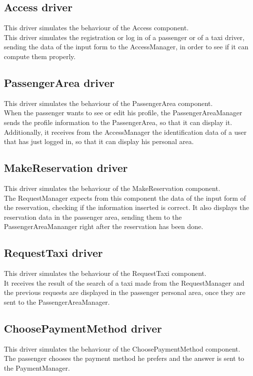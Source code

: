 \documentclass[18pt,oneside,a4paper, titlepage]{article}
\begin{document}
	\subsection{Access driver}
		This driver simulates the behaviour of the Access component.\\ This driver simulates the registration or log in of a passenger or of a taxi driver, sending the data of the input form to the AccessManager, in order to see if it can compute them properly.
	\subsection{PassengerArea driver}
		This driver simulates the behaviour of the PassengerArea component.\\ When the passenger wants to see or edit his profile, the PassengerAreaManager sends the profile information to the PassengerArea, so that it can display it. Additionally, it receives from the AccessManager the identification data of a user that has just logged in, so that it can display his personal area.
	\subsection{MakeReservation driver}
		This driver simulates the behaviour of the MakeReservation component.\\ The RequestManager expects from this component the data of the input form of the reservation, checking if the information inserted is correct. It also displays the reservation data in the passenger area, sending them to the PassengerAreaMananger right after the reservation has been done.
	\subsection{RequestTaxi driver}
		This driver simulates the behaviour of the RequestTaxi component.\\ It receives the result of the search of a taxi made from the RequestManager and the previous requests are displayed in the passenger personal area, once they are sent to the PassengerAreaManager.
	\subsection{ChoosePaymentMethod driver}
		This driver simulates the behaviour of the ChoosePaymentMethod component.\\ The passenger chooses the payment method he prefers and the answer is sent to the PaymentManager.
	\newpage
\end{document}
